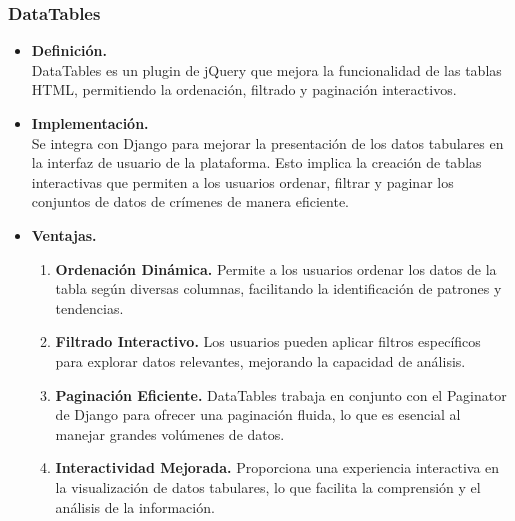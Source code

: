 \documentclass{article}
\begin{document}
        \subsubsection{DataTables}
            \begin{itemize}
                \item \textbf{Definición.}\\
                DataTables es un plugin de jQuery que mejora la funcionalidad de las tablas HTML, permitiendo la ordenación, filtrado y paginación interactivos.

                \item \textbf{Implementación.}\\
                Se integra con Django para mejorar la presentación de los datos tabulares en la interfaz de usuario de la plataforma. Esto implica la creación de tablas interactivas que permiten a los usuarios ordenar, filtrar y paginar los conjuntos de datos de crímenes de manera eficiente.

                \item \textbf{Ventajas.}\\
                \begin{enumerate}
                    \item \textbf{Ordenación Dinámica.} Permite a los usuarios ordenar los datos de la tabla según diversas columnas, facilitando la identificación de patrones y tendencias.

                    \item \textbf{Filtrado Interactivo.} Los usuarios pueden aplicar filtros específicos para explorar datos relevantes, mejorando la capacidad de análisis.

                    \item \textbf{Paginación Eficiente.} DataTables trabaja en conjunto con el Paginator de Django para ofrecer una paginación fluida, lo que es esencial al manejar grandes volúmenes de datos.

                    \item \textbf{Interactividad Mejorada.} Proporciona una experiencia interactiva en la visualización de datos tabulares, lo que facilita la comprensión y el análisis de la información.
                \end{enumerate}
            \end{itemize}
\end{document}
